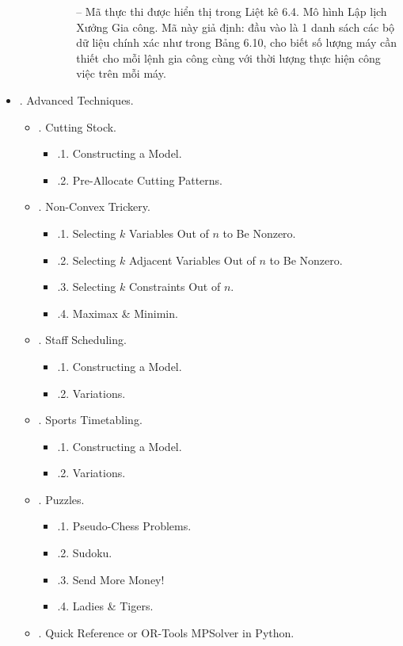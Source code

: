 \documentclass{article}
\begin{document}
\begin{itemize}
\begin{itemize}
\begin{itemize}
\begin{itemize}
                -- Mã thực thi được hiển thị trong {\sf Liệt kê 6.4. Mô hình Lập lịch Xưởng Gia công}. Mã này giả định: đầu vào là 1 danh sách các bộ dữ liệu chính xác như trong Bảng 6.10, cho biết số lượng máy cần thiết cho mỗi lệnh gia công cùng với thời lượng thực hiện công việc trên mỗi máy.
            \end{itemize}
        \end{itemize}
    \end{itemize}
    \item {. Advanced Techniques.}
    \begin{itemize}
        \item {. Cutting Stock.}
        \begin{itemize}
            \item {.1. Constructing a Model.}
            \item {.2. Pre-Allocate Cutting Patterns.}
        \end{itemize}
        \item {. Non-Convex Trickery.}
        \begin{itemize}
            \item {.1. Selecting $k$ Variables Out of $n$ to Be Nonzero.}
            \item {.2. Selecting $k$ Adjacent Variables Out of $n$ to Be Nonzero.}
            \item {.3. Selecting $k$ Constraints Out of $n$.}
            \item {.4. Maximax \& Minimin.}
        \end{itemize}
        \item {. Staff Scheduling.}
        \begin{itemize}
            \item {.1. Constructing a Model.}
            \item {.2. Variations.}
        \end{itemize}
        \item {. Sports Timetabling.}
        \begin{itemize}
            \item {.1. Constructing a Model.}
            \item {.2. Variations.}
        \end{itemize}
        \item {. Puzzles.}
        \begin{itemize}
            \item {.1. Pseudo-Chess Problems.}
            \item {.2. Sudoku.}
            \item {.3. Send More Money!}
            \item {.4. Ladies \& Tigers.}
        \end{itemize}
        \item {. Quick Reference or OR-Tools MPSolver in Python.}
    \end{itemize}
\end{itemize}
\end{document}
